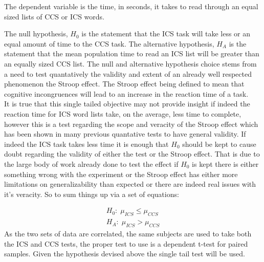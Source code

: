 \documentclass{article}
\begin{document}
The dependent variable is the time, in seconds, it takes to read through an
equal sized lists of CCS or ICS words.  


The null hypothesis, \(H_0\) is the statement that the ICS task will take less
or an equal amount of time to the CCS task. The alternative hypothesis, \(H_A\)
is the statement that the mean population time to read an ICS list will be
greater than an equally sized CCS list. The null and alternative hypothesis
choice stems from a need to test quantatively the validity and extent of an
already well respected phenomenon the Stroop effect. The Stroop effect being
defined to mean that cognitive incongruences will lead to an increase in the
reaction time of a task.\\ It is true that this single tailed objective may not
provide insight if indeed the reaction time for ICS word lists take, on the
average, less time to complete, however this is a test regarding the scope and
veracity of the Stroop effect which has been shown in many previous quantative
tests to have general validity. If indeed the ICS task takes less time it is
enough that \(H_0\) should be kept to cause doubt regarding the validity of
either the test or the Stroop effect.  That is due to the large body of work
already done to test the effect if \(H_0\) is kept there is either something
wrong with the experiment or the Stroop effect has either more limitations on
generalizability than expected or there are indeed real issues with it's
veracity. So to sum things up via a set of equations:

\begin{align}
H_0:\; \mu_{ICS} \le \mu_{CCS} \\
H_A:\; \mu_{ICS} > \mu_{CCS}
\end{align}
As the two sets of data are correlated, the same subjects are used to take both
the ICS and CCS tests, the proper test to use is a dependent t-test for paired
samples.  Given the hypothesis devised above the single tail test will be used.

\end{document}
